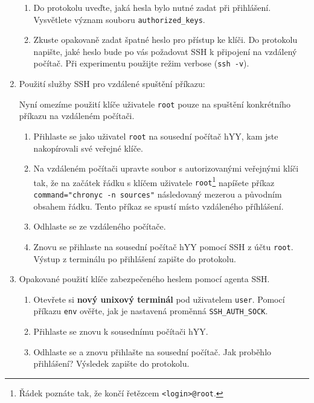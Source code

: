 \documentclass[a4paper,11pt]{article}
\begin{document}
\begin{enumerate}
\begin{enumerate}
      \item Do protokolu uveďte, jaká hesla bylo nutné zadat při přihlášení. Vysvětlete význam souboru \texttt{authorized\_keys}.
      \item Zkuste opakovaně zadat špatné heslo pro přístup ke klíči. Do protokolu napište, jaké heslo bude po vás požadovat SSH k připojení na vzdálený počítač. Při experimentu použijte režim verbose (\texttt{ssh -v}).
    \end{enumerate}

  \item Použití služby SSH pro vzdálené spuštění příkazu:
    
    Nyní omezíme použití klíče uživatele {\tt root} pouze na spuštění konkrétního příkazu na vzdáleném počítači.
    \begin{enumerate}
    \item Přihlaste se jako uživatel {\tt root} na sousední počítač hYY, kam jste nakopírovali své veřejné klíče.
    \item Na vzdáleném počítači upravte soubor s autorizovanými veřejnými klíči tak, že na začátek řádku s klíčem uživatele {\tt root}\footnote{Řádek poznáte tak, že končí řetězcem {\tt <login>@root}.} napíšete příkaz 
        \verb|command="chronyc -n sources"| následova\-ný mezerou a původním obsahem řádku. Tento příkaz se spustí místo vzdáleného příhlášení. 
      \item Odhlaste se ze vzdáleného počítače.
      \item Znovu se přihlaste na sousední počítač hYY pomocí SSH z účtu {\tt root}. Výstup z terminálu po přihlášení zapište do protokolu.
    \end{enumerate}
  \item Opakované použití klíče zabezpečeného heslem pomocí agenta SSH.
    \begin{enumerate}
      \item Otevřete si \textbf{nový unixový terminál} pod uživatelem {\tt user}. Pomocí příkazu \verb|env| ověřte, jak je nastavená proměnná \verb|SSH_AUTH_SOCK|.
      \item Přihlaste se znovu k sousednímu počítači hYY.
      \item Odhlaste se a znovu přihlašte na sousední počítač. Jak proběhlo přihlášení? Výsledek zapište do protokolu.
    \end{enumerate}
\end{enumerate}
\end{document}
